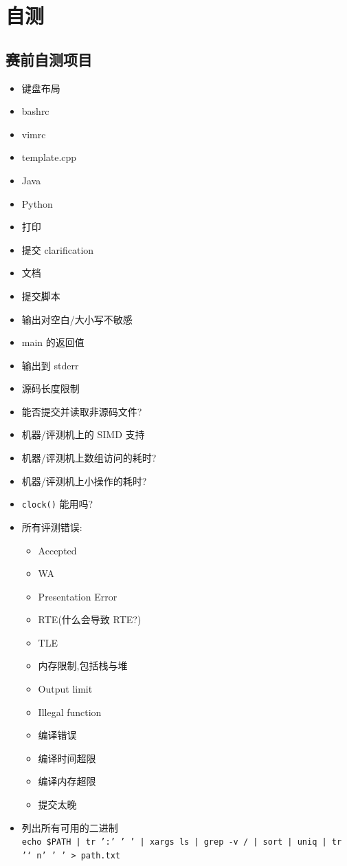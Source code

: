 \appendix
\chapter{自测}

\section{赛前自测项目}
\begin{itemize}
	\item 键盘布局
	\item bashrc
	\item vimrc
	\item template.cpp
	\item Java
	\item Python
	\item 打印
	\item 提交 clarification
	\item 文档
	\item 提交脚本
	\item 输出对空白/大小写不敏感
	\item main 的返回值
	\item 输出到 stderr
	\item 源码长度限制
	\item 能否提交并读取非源码文件?
	\item 机器/评测机上的 SIMD 支持
	\item 机器/评测机上数组访问的耗时?
	\item 机器/评测机上小操作的耗时?
	\item \texttt{clock()} 能用吗?
	\item 所有评测错误:
		\begin{itemize}
			\item Accepted
			\item WA
			\item Presentation Error
			\item RTE(什么会导致 RTE?)
			\item TLE
			\item 内存限制,包括栈与堆
			\item Output limit
			\item Illegal function
			\item 编译错误
			\item 编译时间超限
			\item 编译内存超限
			\item 提交太晚
		\end{itemize}
	\item 列出所有可用的二进制\\
		\texttt{echo \$PATH | tr ':' ' ' | xargs ls | grep -v / | sort | uniq | tr '\char`\\n' ' ' > path.txt}
\end{itemize}
